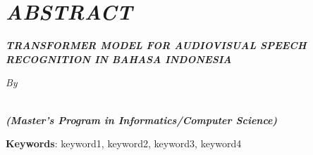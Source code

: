 \clearpage
\chapter*{\textit{ABSTRACT}}

\begin{center}
	\begin{spacing}{1}
    \Large \bfseries \textit{\MakeUppercase{Transformer Model For Audiovisual Speech Recognition in Bahasa Indonesia}}
    \end{spacing}
    
    \Large \textit{By} \\
    \begin{spacing}{1}
		\bfseries \Large \theauthor \\
		\textit{(Master's Program in Informatics/Computer Science)}
    \end{spacing}
\end{center}

\begin{italic}
\begin{spacing}{1}
	\blindtext

	\blindtext
	
	\textbf{Keywords}: keyword1, keyword2, keyword3, keyword4
\end{spacing}
\end{italic}
\clearpage